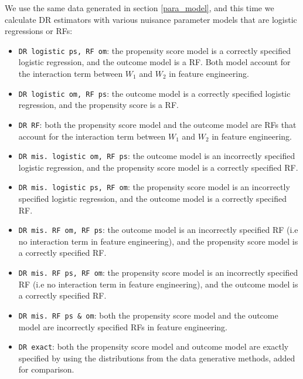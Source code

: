 \documentclass[12pt,twoside]{article}
\begin{document}
We use the same data generated in section \ref{para_model}, and this time we calculate DR estimators with various nuisance parameter models that are logistic regressions or RFs:
\begin{itemize}
    \item \texttt{DR logistic ps, RF om}: the propensity score model is a correctly specified logistic regression, and the outcome model is a RF. Both model account for the interaction term between $W_1$ and $W_2$ in feature engineering.
    \item \texttt{DR logistic om, RF ps}: the outcome model is a correctly specified logistic regression, and the propensity score is a RF.
    \item \texttt{DR RF}: both the propensity score model and the outcome model are RFs that account for the interaction term between $W_1$ and $W_2$ in feature engineering.
    \item \texttt{DR mis. logistic om, RF ps}: the outcome model is an incorrectly specified logistic regression, and the propensity score model is a correctly specified RF.
    \item \texttt{DR mis. logistic ps, RF om}: the propensity score model is an incorrectly specified logistic regression, and the outcome model is a correctly specified RF.
    \item \texttt{DR mis. RF om, RF ps}: the outcome model is an incorrectly specified RF (i.e no interaction term in feature engineering), and the propensity score model is a correctly specified RF.
    \item \texttt{DR mis. RF ps, RF om}: the propensity score model is an incorrectly specified RF (i.e no interaction term in feature engineering), and the outcome model is a correctly specified RF.
    \item \texttt{DR mis. RF ps \& om}: both the propensity score model and the outcome model are incorrectly specified RFs in feature engineering.
    \item \texttt{DR exact}: both the propensity score model and outcome model are exactly specified by using the distributions from the data generative methods, added for comparison.
\end{itemize}
\end{document}
